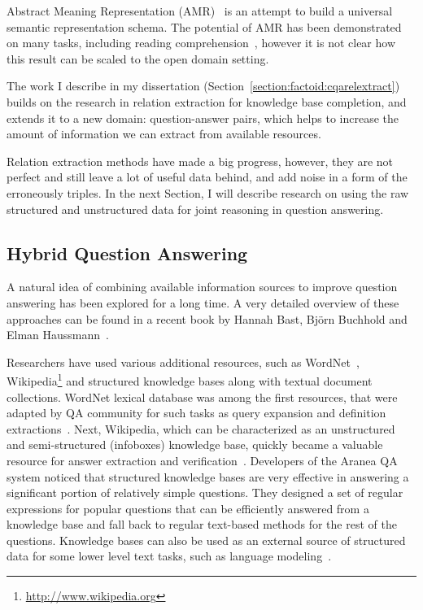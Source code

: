 Abstract Meaning Representation (AMR)~\cite{banarescu2012abstract} is an attempt to build a universal semantic representation schema.
The potential of AMR has been demonstrated on many tasks, including reading comprehension~\cite{wang2016reading}, however it is not clear how this result can be scaled to the open domain setting.

The work I describe in my dissertation (Section~\ref{section:factoid:cqarelextract}) builds on the research in relation extraction for knowledge base completion, and extends it to a new domain: question-answer pairs, which helps to increase the amount of information we can extract from available resources.

Relation extraction methods have made a big progress, however, they are not perfect and still leave a lot of useful data behind, and add noise in a form of the erroneously triples.
In the next Section, I will describe research on using the raw structured and unstructured data for joint reasoning in question answering.

\subsection{Hybrid Question Answering}
\label{section:relatedwork:factoid:hybrid}

A natural idea of combining available information sources to improve question answering has been explored for a long time.
A very detailed overview of these approaches can be found in a recent book by Hannah Bast, Bj\"orn Buchhold and Elman Haussmann~\cite{bast2016semantic}.

Researchers have used various additional resources, such as WordNet~\cite{miller1995wordnet}, Wikipedia\footnote{\href{url}{http://www.wikipedia.org}} and structured knowledge bases along with textual document collections.
WordNet lexical database was among the first resources, that were adapted by QA community for such tasks as query expansion and definition extractions~\cite{hovy2001use,pasca2001informative}.
Next, Wikipedia, which can be characterized as an unstructured and semi-structured (infoboxes) knowledge base, quickly became a valuable resource for answer extraction and verification~\cite{ahn2005using,buscaldi2006mining}.
Developers of the Aranea QA~\cite{lin2003question} system noticed that structured knowledge bases are very effective in answering a significant portion of relatively simple questions.
They designed a set of regular expressions for popular questions that can be efficiently answered from a knowledge base and fall back to regular text-based methods for the rest of the questions.
Knowledge bases can also be used as an external source of structured data for some lower level text tasks, such as language modeling~\cite{ahn2016neural}.

